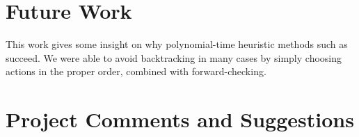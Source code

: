 \section{Future Work}

This work gives some insight on why polynomial-time heuristic methods such as \cite{ipdpsEbnenasir11} succeed.
We were able to avoid backtracking in many cases by simply choosing actions in the proper order, combined with forward-checking.

\section{Project Comments and Suggestions}










